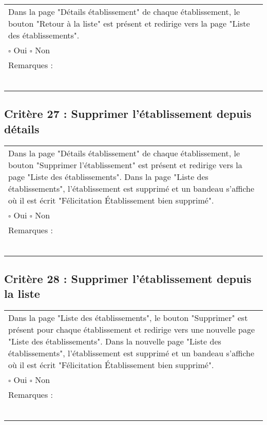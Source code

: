 	\begin{center}
    	 		\begin{tabular}[h]{|p{}|}
			\hline
				Dans la page "Détails établissement" de chaque établissement, le bouton "Retour à la liste" est présent et redirige vers la page "Liste des établissements".\\
				$\square$ Oui  \hfill \hfill $\square$ Non \\\hline Remarques : \\ ~\\
			 \\\hline
     		\end{tabular}
  		\end{center}	
  		
  		
  		\subsection*{Critère 27 : Supprimer l'établissement depuis détails}
	
	\begin{center}
    	 		\begin{tabular}[h]{|p{}|}
			\hline
				Dans la page "Détails établissement" de chaque établissement, le bouton "Supprimer l'établissement" est présent et redirige vers la page "Liste des établissements". Dans la page "Liste des établissements", l'établissement est supprimé et un bandeau s'affiche où il est écrit "Félicitation Établissement bien supprimé".\\
				$\square$ Oui  \hfill \hfill $\square$ Non \\\hline Remarques : \\ ~\\
			 \\\hline
     		\end{tabular}
  		\end{center}
  		
  		
  		
  			\subsection*{Critère 28 : Supprimer l'établissement depuis la liste}
	
	\begin{center}
    	 		\begin{tabular}[h]{|p{}|}
			\hline
				Dans la page "Liste des établissements", le bouton "Supprimer" est présent pour chaque établissement et redirige vers une nouvelle page "Liste des établissements". Dans la nouvelle page "Liste des établissements", l'établissement est supprimé et un bandeau s'affiche où il est écrit "Félicitation Établissement bien supprimé".\\
				$\square$ Oui  \hfill \hfill $\square$ Non \\\hline Remarques : \\ ~\\
			 \\\hline
     		\end{tabular}
  		\end{center}

